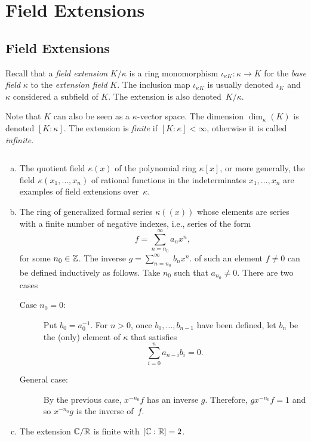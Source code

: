 \chapter{Field Extensions}

\section{Field Extensions}

Recall that a \textsl{field extension} $K/\kappa$ is a ring monomorphism $\iota_{\kappa K}\colon\kappa\to K$ for the \textsl{base field} $\kappa$ to the \textsl{extension field} $K$. The inclusion map $\iota_{\kappa K}$ is usually denoted $\iota_K$ and $\kappa$ considered a subfield of $K$. The extension is also denoted~$K/\kappa$.

Note that $K$ can also be seen as a $\kappa$-vector space. The dimension $\dim_\kappa(K)$ is denoted $[K:\kappa]$. The extension is \textsl{finite} if $[K:\kappa]<\infty$, otherwise it is called \textsl{infinite}.

\begin{xmpls}${}$
    \begin{enumerate}[a), font=\upshape]
        \item The quotient field $\kappa(x)$ of the polynomial ring $\kappa[x]$, or more generally, the field $\kappa(x_1,\dots,x_n)$ of rational functions in the indeterminates $x_1,\dots,x_n$ are examples of field extensions over~$\kappa$.

        \item The ring of generalized formal series $\kappa((x))$ whose elements are series with a finite number of negative indexes, i.e., series of the form
        $$
            f = \sum_{n=n_0}^\infty a_nx^n,
        $$
        for some $n_0\in\mathbb{Z}$. The inverse $g=\sum_{n=n_0}^\infty b_nx^n$. of such an element $f\ne0$ can be defined inductively as follows. Take $n_0$ such that $a_{n_0}\ne0$. There are two cases        
        \begin{description}
            \item[Case $n_0=0$:] Put $b_0=a_0^{-1}$. For $n>0$, once $b_0,\dots,b_{n-1}$ have been defined, let $b_n$ be the (only) element of $\kappa$ that satisfies
            $$
                \sum_{i=0}^na_{n-i}b_i=0.
            $$
            
            \item[General case:] By the previous case, $x^{-n_0}f$ has an inverse $g$. Therefore, $gx^{-n_0}f=1$ and so $x^{-n_0}g$ is the inverse of~$f$.
        \end{description}

        \item The extension $\mathbb{C}/\mathbb{R}$ is finite with $[\mathbb{C}:\mathbb{R}]=2$.
    \end{enumerate}
\end{xmpls}

